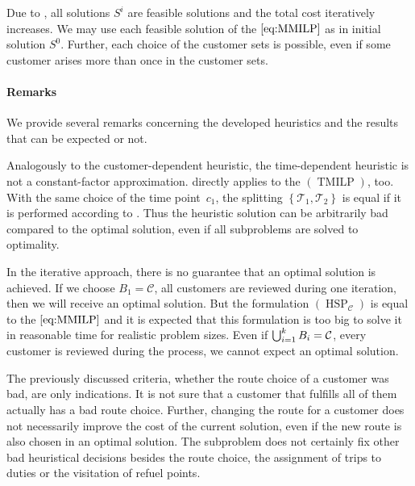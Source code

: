 Due to , all solutions $S^i$ are feasible solutions and the total cost iteratively increases. We may use each feasible solution of the $\eqref{eq:MMILP}$ as in initial solution $S^0$. Further, each choice of the customer sets is possible, even if some customer arises more than once in the customer sets.

\paragraph{Remarks} \parfill

We provide several remarks concerning the developed heuristics and the results that can be expected or not.

Analogously to the customer-dependent heuristic, the time-dependent heuristic is not a constant-factor approximation.  directly applies to the $(\operatorname{TMILP})$, too. With the same choice of the time point~$c_1$, the splitting $\left\{\mathcal{T}_1,\mathcal{T}_2\right\}$ is equal if it is performed according to . Thus the heuristic solution can be arbitrarily bad compared to the optimal solution, even if all subproblems are solved to optimality.

In the iterative approach, there is no guarantee that an optimal solution is achieved. If we choose $B_1=\mathcal{C}$, \ie all customers are reviewed during one iteration, then we will receive an optimal solution. But the formulation $(\operatorname{HSP}_{\mathcal{C}})$ is equal to the $\eqref{eq:MMILP}$ and it is expected that this formulation is too big to solve it in reasonable time for realistic problem sizes. Even if ${\bigcup_{i=1}^k B_i = \mathcal{C}}$, \ie every customer is reviewed during the process, we cannot expect an optimal solution.

The previously discussed criteria, whether the route choice of a customer was bad, are only indications. It is not sure that a customer that fulfills all of them actually has a bad route choice. Further, changing the route for a customer does not necessarily improve the cost of the current solution, even if the new route is also chosen in an optimal solution. The subproblem does not certainly fix other bad heuristical decisions besides the route choice, \eg the assignment of trips to duties or the visitation of refuel points.

